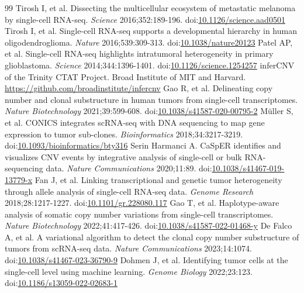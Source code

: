 \documentclass[11pt]{article}
\begin{document}
\begin{thebibliography}{99}
\small
{} Tirosh I, et al. Dissecting the multicellular ecosystem of metastatic melanoma by single-cell RNA-seq. \emph{Science} 2016;352:189-196. doi:\href{https://doi.org/10.1126/science.aad0501}{10.1126/science.aad0501}
 Tirosh I, et al. Single-cell RNA-seq supports a developmental hierarchy in human oligodendroglioma. \emph{Nature} 2016;539:309-313. doi:\href{https://doi.org/10.1038/nature20123}{10.1038/nature20123}
 Patel AP, et al. Single-cell RNA-seq highlights intratumoral heterogeneity in primary glioblastoma. \emph{Science} 2014;344:1396-1401. doi:\href{https://doi.org/10.1126/science.1254257}{10.1126/science.1254257}
 inferCNV of the Trinity CTAT Project. Broad Institute of MIT and Harvard. \url{https://github.com/broadinstitute/infercnv}
 Gao R, et al. Delineating copy number and clonal substructure in human tumors from single-cell transcriptomes. \emph{Nature Biotechnology} 2021;39:599-608. doi:\href{https://doi.org/10.1038/s41587-020-00795-2}{10.1038/s41587-020-00795-2}
 Müller S, et al. CONICS integrates scRNA-seq with DNA sequencing to map gene expression to tumor sub-clones. \emph{Bioinformatics} 2018;34:3217-3219. doi:\href{https://doi.org/10.1093/bioinformatics/bty316}{10.1093/bioinformatics/bty316}
 Serin Harmanci A. CaSpER identifies and visualizes CNV events by integrative analysis of single-cell or bulk RNA-sequencing data. \emph{Nature Communications} 2020;11:89. doi:\href{https://doi.org/10.1038/s41467-019-13779-x}{10.1038/s41467-019-13779-x}
 Fan J, et al. Linking transcriptional and genetic tumor heterogeneity through allele analysis of single-cell RNA-seq data. \emph{Genome Research} 2018;28:1217-1227. doi:\href{https://doi.org/10.1101/gr.228080.117}{10.1101/gr.228080.117}
 Gao T, et al. Haplotype-aware analysis of somatic copy number variations from single-cell transcriptomes. \emph{Nature Biotechnology} 2022;41:417-426. doi:\href{https://doi.org/10.1038/s41587-022-01468-y}{10.1038/s41587-022-01468-y}
 De Falco A, et al. A variational algorithm to detect the clonal copy number substructure of tumors from scRNA-seq data. \emph{Nature Communications} 2023;14:1074. doi:\href{https://doi.org/10.1038/s41467-023-36790-9}{10.1038/s41467-023-36790-9}
 Dohmen J, et al. Identifying tumor cells at the single-cell level using machine learning. \emph{Genome Biology} 2022;23:123. doi:\href{https://doi.org/10.1186/s13059-022-02683-1}{10.1186/s13059-022-02683-1}

\end{thebibliography}
\end{document}
